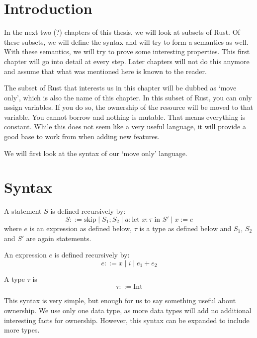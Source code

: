 

\section{Introduction}
In the next two (?) chapters of this thesis, we will look at subsets of Rust. Of these subsets, we will define the syntax and will try to form a semantics as well. With these semantics, we will try to prove some interesting properties. This first chapter will go into detail at every step. Later chapters will not do this anymore and assume that what was mentioned here is known to the reader.

The subset of Rust that interests us in this chapter will be dubbed as `move only', which is also the name of this chapter. In this subset of Rust, you can only assign variables. If you do so, the ownership of the resource will be moved to that variable. You cannot borrow and nothing is mutable. That means everything is constant. While this does not seem like a very useful language, it will provide a good base to work from when adding new features.

We will first look at the syntax of our `move only' language.

\section{Syntax}
\begin{definition}
\label{statementsmove}
A statement $S$ is defined recursively by:
$$S ::= \textrm{skip} \mid S_1; S_2 \mid a: \textrm{let } x:\tau \textrm{ in } S' \mid x := e$$
where $e$ is an expression as defined below, $\tau$ is a type as defined below and $S_1$, $S_2$ and $S'$ are again statements.
\end{definition}

\begin{definition}
\label{expressionsmove}
An expression $e$ is defined recursively by:
$$e ::= x \mid i \mid e_1 + e_2$$
\end{definition}

\begin{definition}
\label{typesmove}
A type $\tau$ is
$$\tau ::= \textrm{Int}$$
\end{definition}

This syntax is very simple, but enough for us to say something useful about ownership. We use only one data type, as more data types will add no additional interesting facts for ownership. However, this syntax can be expanded to include more types. 


